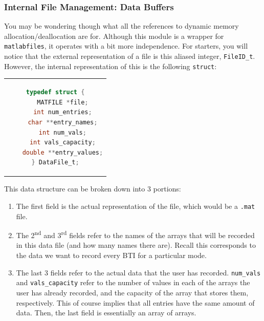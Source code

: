 \documentclass[letterpaper]{article}
\begin{document}
\subsubsection{Internal File Management: Data Buffers}
You may be wondering though what all the references to dynamic memory allocation/deallocation are for. Although this module is a wrapper for \texttt{matlabfiles}, it operates with a bit more independence. For starters, you will notice that the external representation of a file is this aliased integer, \texttt{FileID\_t}. However, the internal representation of this is the following \texttt{struct}:
\begin{center}
    \begin{tabular}{c}
    \begin{lstlisting}[language=C]
typedef struct {
    MATFILE *file;
    int num_entries;
    char **entry_names;
    int num_vals;
    int vals_capacity;
    double **entry_values;
} DataFile_t;
    \end{lstlisting}
    \end{tabular}
\end{center}

This data structure can be broken down into 3 portions:
\begin{enumerate}
    \item The first field is the actual representation of the file, which would be a \texttt{.mat} file.
    \item The 2\textsuperscript{nd} and 3\textsuperscript{rd} fields refer to the names of the arrays that will be recorded in this data file (and how many names there are). Recall this corresponds to the data we want to record every BTI for a particular mode.
    \item The last 3 fields refer to the actual data that the user has recorded. \texttt{num\_vals} and \texttt{vals\_capacity} refer to the number of values in each of the arrays the user has already recorded, and the capacity of the array that stores them, respectively. This of course implies that all entries have the same amount of data. Then, the last field is essentially an array of arrays.
\end{enumerate}
\end{document}
